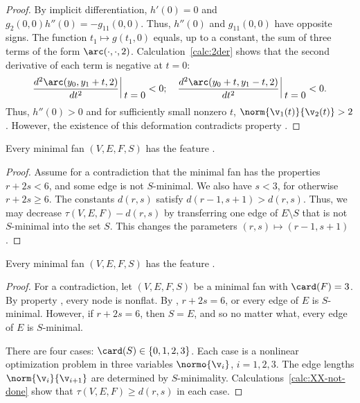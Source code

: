 \begin{proof}
By implicit differentiation, $h'(0) = 0$ and $g_2(0,0) h''(0) =
-g_{11}(0,0)$.  Thus, $h''(0)$ and $g_{11}(0,0)$ have opposite signs.
The function $t_1\mapsto g(t_1,0)$ equals, up to a constant, the sum
of three terms of the form $\arc(\cdot,\cdot,2)$.
Calculation~\ref{calc:2der} shows that the second derivative of each
term  is negative at $t=0$:
\begin{equation}\label{eqn:arc''}
\def\vt{\vrule_{\relax{\raisebox{-0.55em}{\ensuremath{\displaystyle{~t=0}}}}}}
\frac{d^2 \arc(y_0,y_1+t,2)}{d t^2}\,\vt < 0;\quad
\dfrac{d^2 \arc(y_0+t,y_1-t,2)}{d t^2}\,\vt < 0.
\end{equation}  
Thus, $h''(0)>0$
and for sufficiently small nonzero $t$, $\norm{\v_1(t)}{\v_2(t)}>2$.
However, the existence of this deformation contradicts property
.
\end{proof}


\begin{lemma}[] 
Every minimal fan $(V,E,F,S)$ has the feature .
\end{lemma}

\begin{proof} Assume for a contradiction that the minimal fan has the
  properties $r+2s < 6$, and some edge is not $S$-minimal.  We also
  have $s<3$, for otherwise $r+2s\ge 6$.  The constants $d(r,s)$
  satisfy $d(r-1,s+1) > d(r,s)$.  Thus, we may decrease
  $\tau(V,E,F)-d(r,s)$ by transferring one edge of $E\setminus S$ that
  is not $S$-minimal into the set $S$.  This changes the parameters
  $(r,s)\mapsto (r-1,s+1)$.
\end{proof}

\begin{lemma}[]\label{lemma:triangle-free}
Every minimal fan $(V,E,F,S)$ has the feature .
\end{lemma}

\begin{proof}
  For a contradiction, let $(V,E,F,S)$ be a minimal fan with
  $\card(F)=3$.  By property , every node is nonflat.
  By , $r+2s=6$, or every edge of $E$ is $S$-minimal.
  However, if $r+2s=6$, then $S=E$, and so no matter what, every edge
  of $E$ is $S$-minimal.

There are four cases: $\card(S)\in\{0,1,2,3\}$.  Each case is a
nonlinear optimization problem in three variables $\normo{\v_i}$,
$i=1,2,3$.  The edge lengths $\norm{\v_i}{\v_{i+1}}$ are determined by
$S$-minimality.  Calculations~\ref{calc:XX-not-done} show that
$\tau(V,E,F)\ge d(r,s)$ in each case.
\end{proof}



